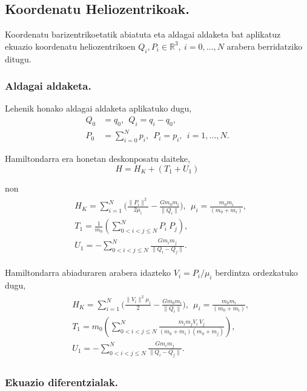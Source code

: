 \subsection*{Koordenatu Heliozentrikoak.}

Koordenatu barizentrikoetatik abiatuta eta aldagai aldaketa bat aplikatuz ekuazio koordenatu heliozentrikoen $Q_i,P_i \in \mathbb{R}^3, \ i=0,\dots,N$ 
arabera berridatziko ditugu. 

\subsubsection*{Aldagai aldaketa.}
Lehenik honako aldagai aldaketa aplikatuko dugu,
\begin{align*}
Q_0 &=q_0, \ \ Q_i=q_i-q_0, \\ 
P_0 &=\sum\limits_{i=0}^{N}p_i, \ \ P_i=p_i, \ \ i=1,\dots{,N}.
\end{align*}

Hamiltondarra era honetan deskonposatu daiteke,
\begin{equation*}
H=H_K+(T_1+U_1)
\end{equation*}

non
\begin{align}
\begin{split}
&H_K=\sum\limits_{i=1}^{N}\bigg(\frac{\|P_i\|^2}{2 \mu_i} -\frac{G m_0 m_i}{\|Q_i\|}\bigg), \ \ \mu_i=\frac{m_0m_i}{(m_0+m_i)}, \\
&T_1=\frac{1}{m_0} \left(\sum\limits_{0<i<j\le N}^{N} P_i\ P_j \right),\\
&U_1= -\sum\limits_{0< i<j\le N}^{N} \frac{G m_i m_j}{\|Q_i-Q_j\|}.
\end{split}
\end{align}

Hamiltondarra abiaduraren arabera idazteko $V_i=P_i/\mu_i$ berdintza ordezkatuko dugu,
\begin{align}
\begin{split}
\label{eq:nbodyHel}
&H_K=\sum\limits_{i=1}^{N}\bigg(\frac{\|V_i\|^2 \mu_i}{2} -\frac{G m_0 m_i}{\|Q_i\|}\bigg), \ \ \mu_i=\frac{m_0m_i}{(m_0+m_i)}, \\
&T_1=m_0 \left(\sum\limits_{0<i<j\le N}^{N} \frac{m_i m_j V_i\ V_j}{(m_0+m_i)(m_0+m_j)} \right),\\
&U_1= -\sum\limits_{0< i<j\le N}^{N} \frac{G m_i m_j}{\|Q_i-Q_j\|}.
\end{split}
\end{align}

\subsubsection*{Ekuazio diferentzialak.}

